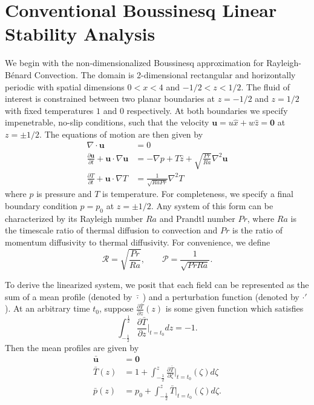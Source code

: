 \documentclass[reprint,amsmath,amssymb,aps]{revtex4-1}
\begin{document}
\section{Conventional Boussinesq Linear Stability Analysis}\label{sec:boussinesq}
We begin with the non-dimensionalized Boussinesq approximation for Rayleigh-Bénard Convection. The domain is 2-dimensional rectangular and horizontally periodic with spatial dimensions $0 < x < 4$ and $-1/2 < z < 1/2$. The fluid of interest is constrained between two planar boundaries at $z = -1/2$ and $z = 1/2$ with fixed temperatures $1$ and $0$ respectively. At both boundaries we specify impenetrable, no-slip conditions, such that the velocity $\mathbf{u} = u \hat{x} + w \hat{z} = \mathbf{0}$ at $z = \pm 1/2$. The equations of motion are then given by
\begin{align}
    \nabla \cdot \mathbf{u} &= 0 \label{EQ:motion1}\\
    \frac{\partial \mathbf{u}}{\partial t} + \mathbf{u} \cdot \nabla \mathbf{u} &= - \nabla p + T \hat{z} + \sqrt{\frac{Pr}{Ra}} \nabla^2 \mathbf{u} \label{EQ:motion2}\\
    \frac{\partial T}{\partial t} + \mathbf{u} \cdot \nabla T &= \frac{1}{\sqrt{RaPr}} \nabla^2 T \label{EQ:motion3}
\end{align}
where $p$ is pressure and $T$ is temperature. For completeness, we specify a final boundary condition $p = p_0$ at $z = \pm 1/2$. Any system of this form can be characterized by its Rayleigh number $Ra$ and Prandtl number $Pr$, where $Ra$ is the timescale ratio of thermal diffusion to convection and $Pr$ is the ratio of momentum diffusivity to thermal diffusivity.  For convenience, we define 
\begin{equation}
\mathcal{R} = \sqrt{\frac{Pr}{Ra}}, \qquad \mathcal{P} = \frac{1}{\sqrt{Pr Ra}}.
\end{equation}
\par To derive the linearized system, we posit that each field can be represented as the sum of a mean profile (denoted by $\bar{\cdot } \;$) and a perturbation function (denoted by $\cdot'$). At an arbitrary time $t_0$, suppose $\frac{\partial \bar{T}}{\partial z} (z)$ is some given function which satisfies
\begin{equation}
    \int_{-\frac{1}{2}}^{\frac{1}{2}} \frac{\partial \bar{T}}{\partial z}\Big|_{t=t_0} dz = -1.
\end{equation}
Then the mean profiles are given by
\begin{align}
    \mathbf{\bar{u}} &= \mathbf{0} \\
    \bar{T}(z) &= 1 + \int_{-\frac{1}{2}}^{z} \frac{\partial \bar{T}}{\partial \zeta}\Big|_{t=t_0}(\zeta) d\zeta \\
    \bar{p}(z) &= p_0 + \int_{-\frac{1}{2}}^z \bar{T}\Big|_{t=t_0}(\zeta) d\zeta.
\end{align}
\end{document}
